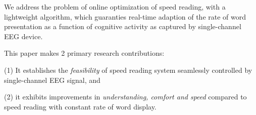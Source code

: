 We address the problem of online optimization of speed reading, with a lightweight algorithm, which guaranties real-time adaption of the rate of word presentation as a function of cognitive activity as captured by single-channel EEG device.

This paper makes 2 primary research contributions: 

(1) It establishes the {\it feasibility} of speed reading system seamlessly controlled by single-channel EEG signal, and 

(2) it exhibits improvements in {\it understanding, comfort and speed} compared to speed reading with constant rate of word display.


%
%
% 
